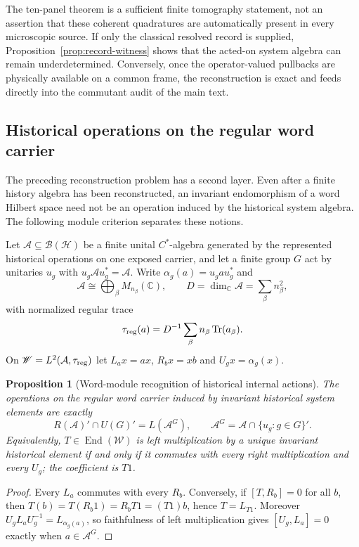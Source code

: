 \documentclass[11pt]{article}
\numberwithin{equation}{section}
\newtheorem{proposition}[theorem]{Proposition}
\theoremstyle{definition}
\theoremstyle{remark}
\newcommand{\C}{\mathbb C}
\newcommand{\Tr}{\operatorname{Tr}}
\newcommand{\End}{\operatorname{End}}
\newcommand{\A}{\mathcal A}
\newcommand{\Hh}{\mathcal H}
\begin{document}
The ten-panel theorem is a sufficient finite tomography statement, not an
assertion that these coherent quadratures are automatically present in every
microscopic source.  If only the classical resolved record is supplied,
Proposition~\ref{prop:record-witness} shows that the acted-on system algebra
can remain underdetermined.  Conversely, once the operator-valued pullbacks
are physically available on a common frame, the reconstruction is exact and
feeds directly into the commutant audit of the main text.


\subsection{Historical operations on the regular word carrier}
\label{sec:historical-operation-recognition}

The preceding reconstruction problem has a second layer.  Even after a finite
history algebra has been reconstructed, an invariant endomorphism of a word
Hilbert space need not be an operation induced by the historical system
algebra.  The following module criterion separates these notions.

Let $\A\subseteq\mathcal B(\Hh)$ be a finite unital $C^*$-algebra generated by
the represented historical operations on one exposed carrier, and let a finite
group $G$ act by unitaries $u_g$ with $u_g\A u_g^*=\A$.  Write
$\alpha_g(a)=u_gau_g^*$ and
\[
 \A\cong\bigoplus_\beta M_{n_\beta}(\C),\qquad
 D=\dim_\C\A=\sum_\beta n_\beta^2,
\]
with normalized regular trace
\[
 \tau_{\rm reg}(a)=D^{-1}\sum_\beta n_\beta\Tr(a_\beta).
\]
On $\mathscr W=L^2(\A,\tau_{\rm reg})$ let
$L_ax=ax$, $R_bx=xb$ and $U_gx=\alpha_g(x)$.

\begin{proposition}[Word-module recognition of historical internal actions]
\label{thm:word-module-recognition}
The operations on the regular word carrier induced by invariant historical
system elements are exactly
\begin{equation}
 R(\A)'\cap U(G)'=L(\A^G),
 \qquad
 \A^G=\A\cap\{u_g:g\in G\}'.
 \label{eq:word-module-recognition}
\end{equation}
Equivalently, $T\in\End(\mathscr W)$ is left multiplication by a unique
invariant historical element if and only if it commutes with every right
multiplication and every $U_g$; the coefficient is $T1$.
\end{proposition}

\begin{proof}
Every $L_a$ commutes with every $R_b$.  Conversely, if $[T,R_b]=0$ for all
$b$, then $T(b)=T(R_b1)=R_bT1=(T1)b$, hence $T=L_{T1}$.  Moreover
$U_gL_aU_g^{-1}=L_{\alpha_g(a)}$, so faithfulness of left multiplication gives
$[U_g,L_a]=0$ exactly when $a\in\A^G$.
\end{proof}
\end{document}
